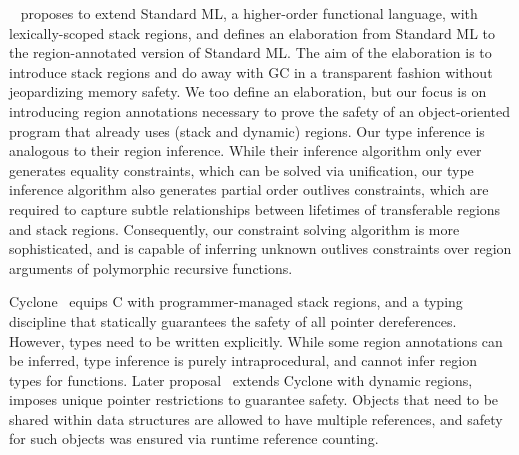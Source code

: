 ~\cite{tofte97} proposes to extend Standard ML, a higher-order
functional language, with lexically-scoped stack regions, and defines
an elaboration from Standard ML to the region-annotated version of
Standard ML. The aim of the elaboration is to introduce stack regions
and do away with GC in a transparent fashion without jeopardizing
memory safety. We too define an elaboration, but our focus is on
introducing region annotations necessary to prove the safety of an
object-oriented program that already uses (stack and dynamic) regions.
Our type inference is analogous to their region inference. While their
inference algorithm only ever generates equality constraints, which
can be solved via unification, our type inference algorithm also
generates partial order outlives constraints, which are required to
capture subtle relationships between lifetimes of transferable regions
and stack regions. Consequently, our constraint solving algorithm is
more sophisticated, and is capable of inferring unknown outlives
constraints over region arguments of polymorphic recursive functions.

Cyclone~\cite{cyclone02} equips C with programmer-managed stack
regions, and a typing discipline that statically guarantees the safety
of all pointer dereferences. However, types need to be written
explicitly. While some region annotations can be inferred, type
inference is purely intraprocedural, and cannot infer region types for
functions. Later proposal~\cite{cyclone04} extends Cyclone with
dynamic regions, imposes unique pointer restrictions to guarantee
safety. Objects that need to be shared within data structures are
allowed to have multiple references, and safety for such objects was
ensured via runtime reference counting.

